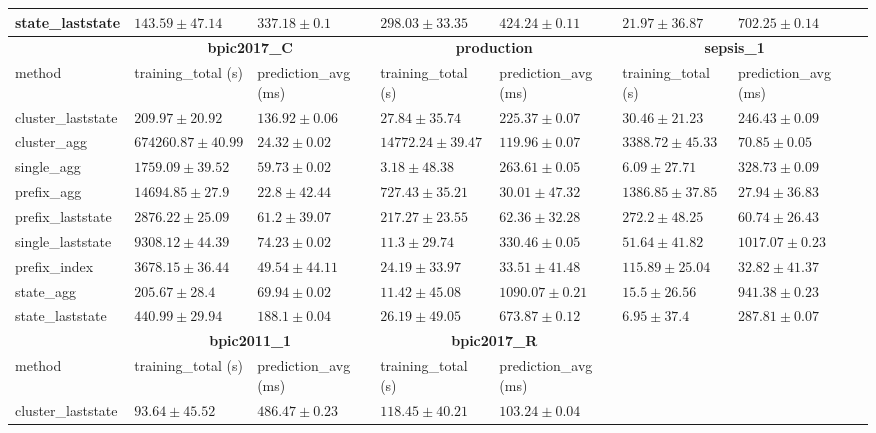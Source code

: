 \documentclass[twoside,11pt]{Latex/Classes/PhDthesisPSnPDF}
\begin{document}
\begin{table}[h]
{\begin{tabular}{llllllll}
			state\_laststate & $143.59 \pm 47.14$ & $337.18 \pm 0.1$ & $298.03 \pm 33.35$ & $424.24 \pm 0.11$ & $21.97 \pm 36.87$ & $702.25 \pm 0.14$ \\ 
			\bottomrule
			\toprule
			& \multicolumn{2}{c}{{\bfseries bpic2017\_C}} & \multicolumn{2}{c}{{\bfseries production}} & \multicolumn{2}{c}{{\bfseries sepsis\_1}} \\ \cmidrule(lr){2-3} \cmidrule(lr){4-5} \cmidrule(lr){6-7}
			method  & training\_total (s) & prediction\_avg (ms) & training\_total (s) & prediction\_avg (ms) & training\_total (s) & prediction\_avg (ms) \\ \midrule
			cluster\_laststate & $209.97 \pm 20.92$ & $136.92 \pm 0.06$ & $27.84 \pm 35.74$ & $225.37 \pm 0.07$ & $30.46 \pm 21.23$ & $246.43 \pm 0.09$ \\ 
			cluster\_agg & $674260.87 \pm 40.99$ & $24.32 \pm 0.02$ & $14772.24 \pm 39.47$ & $119.96 \pm 0.07$ & $3388.72 \pm 45.33$ & $70.85 \pm 0.05$ \\ 
			single\_agg & $1759.09 \pm 39.52$ & $59.73 \pm 0.02$ & $\mathbf{3.18 \pm 48.38}$ & $263.61 \pm 0.05$ & $\mathbf{6.09 \pm 27.71}$ & $328.73 \pm 0.09$ \\ 
			prefix\_agg & $14694.85 \pm 27.9$ & $\mathbf{22.8 \pm 42.44}$ & $727.43 \pm 35.21$ & $\mathbf{30.01 \pm 47.32}$ & $1386.85 \pm 37.85$ & $\mathbf{27.94 \pm 36.83}$ \\ 
			prefix\_laststate & $2876.22 \pm 25.09$ & $61.2 \pm 39.07$ & $217.27 \pm 23.55$ & $62.36 \pm 32.28$ & $272.2 \pm 48.25$ & $60.74 \pm 26.43$ \\ 
			single\_laststate & $9308.12 \pm 44.39$ & $74.23 \pm 0.02$ & $11.3 \pm 29.74$ & $330.46 \pm 0.05$ & $51.64 \pm 41.82$ & $1017.07 \pm 0.23$ \\ 
			prefix\_index & $3678.15 \pm 36.44$ & $49.54 \pm 44.11$ & $24.19 \pm 33.97$ & $33.51 \pm 41.48$ & $115.89 \pm 25.04$ & $32.82 \pm 41.37$ \\ 
			state\_agg & $\mathbf{205.67 \pm 28.4}$ & $69.94 \pm 0.02$ & $11.42 \pm 45.08$ & $1090.07 \pm 0.21$ & $15.5 \pm 26.56$ & $941.38 \pm 0.23$ \\ 
			state\_laststate & $440.99 \pm 29.94$ & $188.1 \pm 0.04$ & $26.19 \pm 49.05$ & $673.87 \pm 0.12$ & $6.95 \pm 37.4$ & $287.81 \pm 0.07$ \\ 
			\bottomrule
			\toprule
			& \multicolumn{2}{c}{{\bfseries bpic2011\_1}} & \multicolumn{2}{c}{{\bfseries bpic2017\_R}} \\ \cmidrule(lr){2-3} \cmidrule(lr){4-5} \cmidrule(lr){6-7}
			method  & training\_total (s) & prediction\_avg (ms) & training\_total (s) & prediction\_avg (ms) \\ \midrule
			cluster\_laststate & $93.64 \pm 45.52$ & $486.47 \pm 0.23$ & $118.45 \pm 40.21$ & $103.24 \pm 0.04$ \\ 
			

\end{tabular}}
\end{table}
\end{document}
